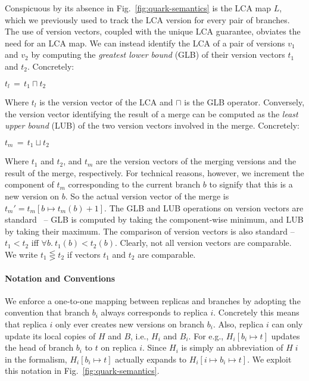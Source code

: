 Conspicuous by its absence in Fig.~\ref{fig:quark-semantics} is the
LCA map $L$, which we previously used to track the LCA version for
every pair of branches. The use of version vectors, coupled with the
unique LCA guarantee, obviates the need for an LCA map.  We can
instead identify the LCA of a pair of versions $v_1$ and $v_2$ by
computing the \emph{greatest lower bound} (GLB) of their version
vectors $t_1$ and $t_2$. Concretely:
\begin{center}
  $t_l \,=\, t_1 \sqcap t_2$
\end{center}
Where $t_l$ is the version vector of the LCA and $\sqcap$ is the GLB
operator. Conversely, the version vector identifying the result of a
merge can be computed as the \emph{least upper bound} (LUB) of the two
version vectors involved in the merge. Concretely:
\begin{center}
  $t_m \,=\, t_1 \sqcup t_2$
\end{center}
Where $t_1$ and $t_2$, and $t_m$ are the version vectors of the
merging versions and the result of the merge, respectively. For
technical reasons, however, we increment the component of $t_m$
corresponding to the current branch $b$ to signify that this is a new
version on $b$. So the actual version vector of the merge is $t_m' =
t_m[b \mapsto t_m(b)+1]$. The GLB and LUB operations on version
vectors are standard~\cite{vectorclock} -- GLB is computed by taking
the component-wise minimum, and LUB by taking their maximum. The
comparison of version vectors is also standard -- $t_1 < t_2$ iff
$\forall b.~t_1(b) < t_2(b)$. Clearly, not all version vectors are
comparable. We write $t_1 \lesseqgtr t_2$ if vectors $t_1$ and $t_2$
are comparable.

\paragraph{Notation and Conventions} We enforce a one-to-one mapping
between replicas and branches by adopting the convention that branch
$b_i$ always corresponds to replica $i$. Concretely this means that
replica $i$ only ever creates new versions on branch $b_i$. Also,
replica $i$ can only update its local copies of $H$ and $B$, i.e.,
$H_i$ and $B_i$. For e.g., $H_i[b_i \mapsto t]$ updates the head of
branch $b_i$ to $t$ on replica $i$.  Since $H_i$ is simply an
abbreviation of $H\;i$ in the formalism, $H_i[b_i \mapsto t]$ actually
expands to $H_i[i \mapsto b_i \mapsto t]$. We exploit this notation in
Fig.~\ref{fig:quark-semantics}. 

